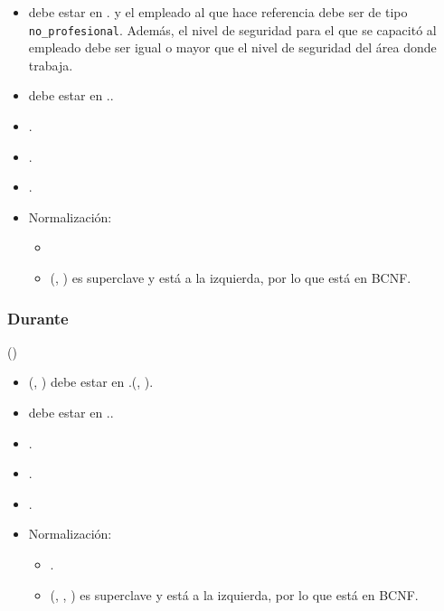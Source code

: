     \begin{itemize}
        \item {} debe estar en . y el 
            empleado al que hace referencia debe ser de tipo 
            \verb|no_profesional|. Además, el nivel de seguridad para el que se
            capacitó al empleado
            debe ser igual o mayor que el nivel de seguridad del área donde
            trabaja.
        \item {} debe estar en ..
        \item {}.
        \item {}.
        \item {}.

        \item Normalización:

            \begin{itemize}
                \item {}
                    
                \item (, ) es superclave y está a la
                    izquierda, por lo que está en BCNF.
            \end{itemize}
    \end{itemize}

\subsubsection{Durante}

    ()

    \begin{itemize}
        \item (, ) debe estar en .(, ).
        \item {} debe estar en ..

        \item {}.
        \item {}.
        \item {}.

        \item Normalización:

            \begin{itemize}
                \item {}.

                \item (, , ) es 
                    superclave y está a la izquierda, por lo que está en BCNF.
            \end{itemize}
    \end{itemize}

